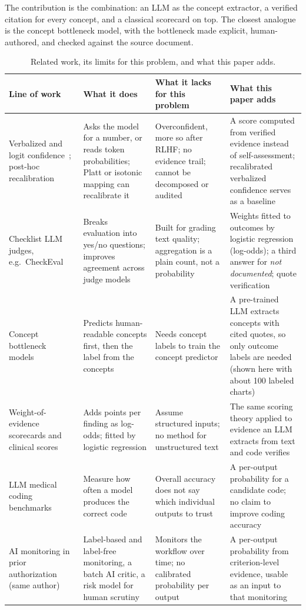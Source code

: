 \documentclass[10pt,letterpaper]{article}
\newcommand{\nd}{\textit{not documented}}
\begin{document}
The contribution is the combination: an LLM as the concept extractor, a verified citation for every concept, and a classical scorecard on top. The closest analogue is the concept bottleneck model, with the bottleneck made explicit, human-authored, and checked against the source document.

\begin{table}[!htbp]
\centering\small
\caption{Related work, its limits for this problem, and what this paper adds.}\label{tab:related}
\begin{tabularx}{\textwidth}{@{}p{2.3cm}LLL@{}}
\toprule
Line of work & What it does & What it lacks for this problem & What this paper adds \\
\midrule
Verbalized and logit confidence~\cite{xiong,leng}; post-hoc recalibration~\cite{platt} & Asks the model for a number, or reads token probabilities; Platt or isotonic mapping can recalibrate it & Overconfident, more so after RLHF; no evidence trail; cannot be decomposed or audited & A score computed from verified evidence instead of self-assessment; recalibrated verbalized confidence serves as a baseline \\
Checklist LLM judges, e.g.\ CheckEval~\cite{checkeval} & Breaks evaluation into yes/no questions; improves agreement across judge models & Built for grading text quality; aggregation is a plain count, not a probability & Weights fitted to outcomes by logistic regression (log-odds); a third answer for \nd; quote verification \\
Concept bottleneck models~\cite{cbm} & Predicts human-readable concepts first, then the label from the concepts & Needs concept labels to train the concept predictor & A pre-trained LLM extracts concepts with cited quotes, so only outcome labels are needed (shown here with about 100 labeled charts) \\
Weight-of-evidence scorecards and clinical scores~\cite{good} & Adds points per finding as log-odds; fitted by logistic regression & Assume structured inputs; no method for unstructured text & The same scoring theory applied to evidence an LLM extracts from text and code verifies \\
LLM medical coding benchmarks~\cite{soroush} & Measure how often a model produces the correct code & Overall accuracy does not say which individual outputs to trust & A per-output probability for a candidate code; no claim to improve coding accuracy \\
AI monitoring in prior authorization~\cite{zeinoun} (same author) & Label-based and label-free monitoring, a batch AI critic, a risk model for human scrutiny & Monitors the workflow over time; no calibrated probability per output & A per-output probability from criterion-level evidence, usable as an input to that monitoring \\
\bottomrule
\end{tabularx}
\end{table}
\end{document}
